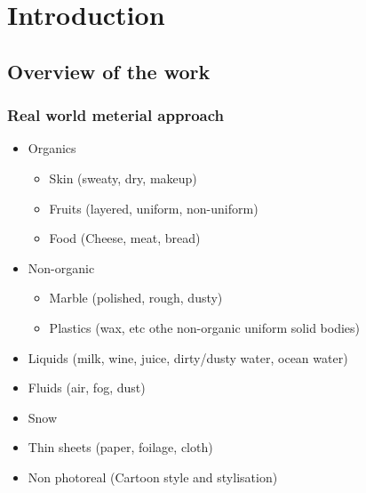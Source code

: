 \chapter{Introduction}
\label{chapter:introduction}

\section{Overview of the work}

\subsection{Real world meterial approach}
\begin{itemize}
    \item Organics
    \begin{itemize}
      \item Skin (sweaty, dry, makeup)
      \item Fruits (layered, uniform, non-uniform)
      \item Food (Cheese, meat, bread)
    \end{itemize}
    \item Non-organic
    \begin{itemize}
      \item Marble (polished, rough, dusty)
      \item Plastics (wax, etc othe non-organic uniform solid bodies)
    \end{itemize}
    \item Liquids (milk, wine, juice, dirty/dusty water, ocean water)
    \item Fluids (air, fog, dust)
    \item Snow
    \item Thin sheets (paper, foilage, cloth)
    \item Non photoreal (Cartoon style and stylisation)
\end{itemize}

